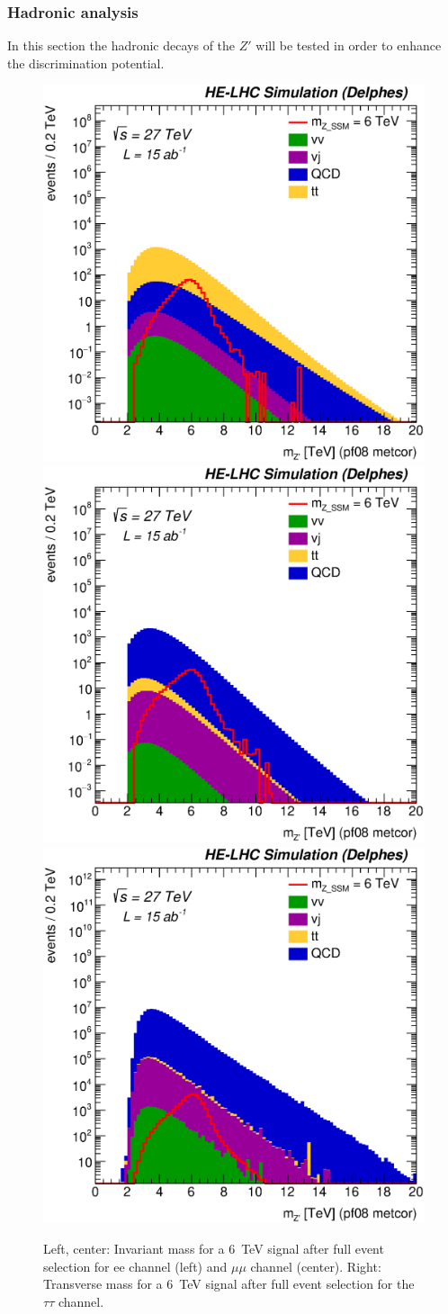 \subsubsection{Hadronic analysis}
\label{subsection:hadana}
In this section the hadronic decays of the $Z'$ will be tested in order to enhance the discrimination potential. 


\begin{figure}[h]
  \centering
  \includegraphics[width=0.30\columnwidth]{Fig/27tev/Mj1j2_pf08_MetCorr_fit_sel0_nostack_log_tt.eps}
  \includegraphics[width=0.30\columnwidth]{Fig/27tev/Mj1j2_pf08_MetCorr_fit_sel0_nostack_log_bb.eps}
  \includegraphics[width=0.30\columnwidth]{Fig/27tev/Mj1j2_pf08_MetCorr_fit_sel0_nostack_log_jj.eps}
  \caption{Left, center: Invariant mass for a 6~TeV signal after full event selection for ee channel (left) and $\mu\mu$ channel (center). Right: Transverse mass for a 6~TeV signal after full event selection for the $\tau\tau$ channel. }
  \label{figure:leptonicresonances:masses}
\end{figure}



